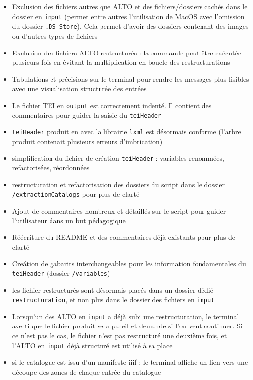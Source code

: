 \documentclass[a4paper,12pt,twoside]{book}
\begin{document}
\begin{itemize}
	\item Exclusion des fichiers autres que ALTO et des fichiers/dossiers  cachés dans le dossier en \texttt{input} (permet entre autres l'utilisation de MacOS avec l'omission du dossier \texttt{.DS\_Store}). Cela permet d'avoir des dossiers contenant des images ou d'autres types de fichiers
	\item Exclusion des fichiers ALTO restructurés : la commande peut être exécutée plusieurs fois en évitant la multiplication en boucle des restructurations
	\item Tabulations et précisions sur le terminal pour rendre les messages plus lisibles avec une visualisation structurée des entrées
	\item Le fichier TEI en \texttt{output} est correctement indenté. Il contient des commentaires pour guider la saisie du \texttt{teiHeader}
	\item \texttt{teiHeader} produit en avec la librairie \texttt{lxml} est désormais conforme (l'arbre produit contenait plusieurs erreurs d'imbrication)
	\item simplification du fichier de création \texttt{teiHeader} : variables renommées, refactorisées, réordonnées 
	\item restructuration et refactorisation des dossiers du script dans le dossier \texttt{/extractionCatalogs} pour plus de clarté 
	\item Ajout de commentaires nombreux et détaillés sur le script pour guider l'utilisateur dans un but pédagogique
	\item Réécriture du README et des commentaires déjà existants pour plus de clarté
	\item Creátion de gabarits interchangeables pour les information fondamentales du \texttt{teiHeader} (dossier \texttt{/variables})
	\item les fichier restructurés sont désormais placés dans un dossier dédié \texttt{restructuration}, et non plus dans le dossier des fichiers en \texttt{input}
	\item Lorsqu'un des ALTO en \texttt{input} a déjà subi une restructuration, le terminal averti que le fichier produit sera pareil et demande si l'on veut continuer. Si ce n'est pas le cas, le fichier n'est pas restructuré une deuxième fois, et l'ALTO en \texttt{input} déjà structuré est utilisé à sa place 
	\item si le catalogue est issu d'un manifeste iiif : le terminal affiche un lien vers une découpe des zones de chaque entrée du catalogue

\end{itemize}
\end{document}

